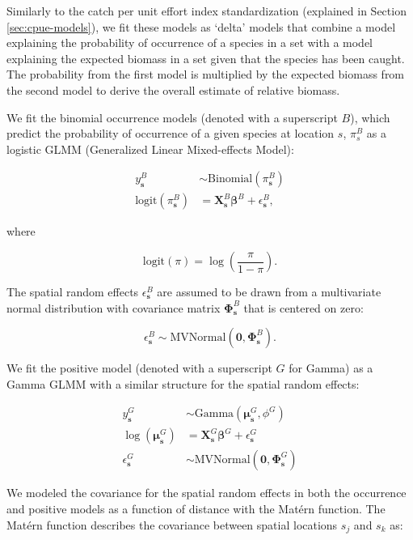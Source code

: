 \documentclass[11pt]{book}\usepackage[]{graphicx}\usepackage[]{color}
\begin{document}
Similarly to the catch per unit effort index standardization (explained in
Section \ref{sec:cpue-models}), we fit these models as `delta' models that
combine a model explaining the probability of occurrence of a species in a set
with a model explaining the expected biomass in a set given that the species has
been caught. The probability from the first model is multiplied by the expected
biomass from the second model to derive the overall estimate of relative
biomass.

We fit the binomial occurrence models (denoted with a superscript $B$), which
predict the probability of occurrence of a given species at location $s$,
$\pi_s^B$ as a logistic GLMM (Generalized Linear Mixed-effects Model):

\begin{align}
  y_\mathbf{s}^B &\sim \mathrm{Binomial}(\pi_\mathbf{s}^B)\\
  \mathrm{logit} \left(\pi_\mathbf{s}^B \right) &= \bm{X}_\mathbf{s}^B \bm{\beta}^B + \epsilon_\mathbf{s}^B,
\end{align}

where

\begin{equation}
  \mathrm{logit}\left(\pi \right) = \log \left( \frac{\pi}{1 - \pi} \right).
\end{equation}

The spatial random effects $\epsilon_\mathbf{s}^B$ are assumed to be drawn from
a multivariate normal distribution with covariance matrix
$\bm{\Phi}_\mathbf{s}^B$ that is centered on zero:

\begin{equation}
  \epsilon_\mathbf{s}^B \sim \mathrm{MVNormal} \left( \bm{0}, \bm{\Phi}_\mathbf{s}^B \right).
\end{equation}

We fit the positive model (denoted with a superscript $G$ for Gamma) as a Gamma
GLMM with a similar structure for the spatial random effects:

\begin{align}
  y_\mathbf{s}^G &\sim \mathrm{Gamma} \left( \bm{\mu}_\mathbf{s}^G, \phi^G \right)\\
  \log \left( \bm{\mu}_\mathbf{s}^G \right) &= \bm{X}_\mathbf{s}^G \bm{\beta}^G + \epsilon_\mathbf{s}^G\\
  \epsilon_\mathbf{s}^G &\sim \mathrm{MVNormal} \left( \bm{0}, \bm{\Phi}_\mathbf{s}^G \right)
\end{align}

We modeled the covariance for the spatial random effects in both the occurrence
and positive models as a function of distance with the Mat\'ern function. The
Mat\'ern function describes the covariance between spatial locations $s_j$ and
$s_k$ as:
\end{document}
